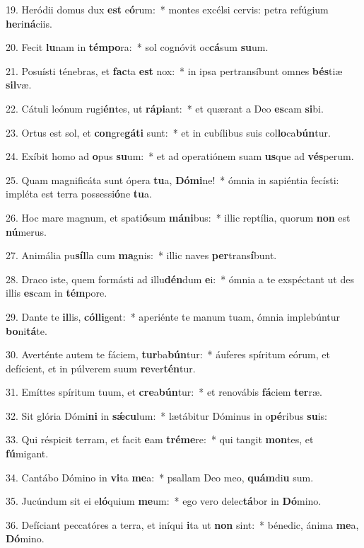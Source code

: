 19. Heródii domus dux \textbf{est} e\textbf{ó}rum:~*  montes excélsi cervis: petra refúgium \textbf{he}ri\textbf{ná}ciis.\

20. Fecit \textbf{lu}nam in \textbf{tém}\textbf{po}ra:~*  sol cognóvit oc\textbf{cá}sum \textbf{su}um.\

21. Posuísti ténebras, et \textbf{fac}ta \textbf{est} nox:~*  in ipsa pertransíbunt omnes \textbf{bés}tiæ \textbf{sil}væ.\

22. Cátuli leónum rugi\textbf{én}tes, ut \textbf{rá}\textbf{pi}ant:~*  et quærant a Deo \textbf{es}cam \textbf{si}bi.\

23. Ortus est sol, et \textbf{con}gre\textbf{gá}\textbf{ti} sunt:~*  et in cubílibus suis col\textbf{lo}ca\textbf{bún}tur.\

24. Exíbit homo ad \textbf{o}pus \textbf{su}um:~*  et ad operatiónem suam \textbf{us}que ad \textbf{vés}perum.\

25. Quam magnificáta sunt ópera \textbf{tu}a, \textbf{Dó}\textbf{mi}ne!~*  ómnia in sapiéntia fecísti: impléta est terra possessi\textbf{ó}ne \textbf{tu}a.\

26. Hoc mare magnum, et spati\textbf{ó}sum \textbf{má}\textbf{ni}bus:~*  illic reptília, quorum \textbf{non} est \textbf{nú}merus.\

27. Animália pu\textbf{síl}la cum \textbf{ma}gnis:~*  illic naves \textbf{per}trans\textbf{í}bunt.\

28. Draco iste, quem formásti ad illu\textbf{dén}dum \textbf{e}i:~*  ómnia a te exspéctant ut des illis \textbf{es}cam in \textbf{tém}pore.\

29. Dante te \textbf{il}lis, \textbf{cól}\textbf{li}gent:~*  aperiénte te manum tuam, ómnia implebúntur \textbf{bo}ni\textbf{tá}te.\

30. Averténte autem te fáciem, \textbf{tur}ba\textbf{bún}tur:~*  áuferes spíritum eórum, et defícient, et in púlverem suum \textbf{re}ver\textbf{tén}tur.\

31. Emíttes spíritum tuum, et \textbf{cre}a\textbf{bún}tur:~*  et renovábis \textbf{fá}ciem \textbf{ter}ræ.\

32. Sit glória Dómi\textbf{ni} in \textbf{sǽ}\textbf{cu}lum:~*  lætábitur Dóminus in o\textbf{pé}ribus \textbf{su}is:\

33. Qui réspicit terram, et facit \textbf{e}am \textbf{tré}\textbf{me}re:~*  qui tangit \textbf{mon}tes, et \textbf{fú}migant.\

34. Cantábo Dómino in \textbf{vi}ta \textbf{me}a:~*  psallam Deo meo, \textbf{quám}di\textbf{u} sum.\

35. Jucúndum sit ei e\textbf{ló}quium \textbf{me}um:~*  ego vero delec\textbf{tá}bor in \textbf{Dó}mino.\

36. Defíciant peccatóres a terra, et iníqui \textbf{i}ta ut \textbf{non} sint:~*  bénedic, ánima \textbf{me}a, \textbf{Dó}mino.\

